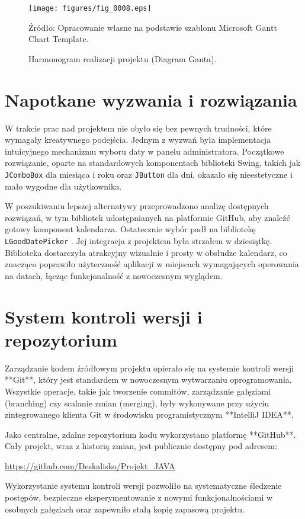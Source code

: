 \begin{figure}[H]
    \centering
    \texttt{[image: figures/fig\_0008.eps]}
    \caption{Harmonogram realizacji projektu (Diagram Ganta).}
    \label{fig:gantt_chart}
    \small{Źródło: Opracowanie własne na podstawie szablonu Microsoft Gantt Chart Template.}
\end{figure}
\clearpage

\section{Napotkane wyzwania i rozwiązania}
W trakcie prac nad projektem nie obyło się bez pewnych trudności, które wymagały kreatywnego podejścia. Jednym z wyzwań była implementacja intuicyjnego mechanizmu wyboru daty w panelu administratora. Początkowe rozwiązanie, oparte na standardowych komponentach biblioteki Swing, takich jak \texttt{JComboBox} dla miesiąca i roku oraz \texttt{JButton} dla dni, okazało się nieestetyczne i mało wygodne dla użytkownika.

W poszukiwaniu lepszej alternatywy przeprowadzono analizę dostępnych rozwiązań, w tym bibliotek udostępnianych na platformie GitHub, aby znaleźć gotowy komponent kalendarza. Ostatecznie wybór padł na bibliotekę \texttt{LGoodDatePicker} \cite{LGoodDatePicker}. Jej integracja z projektem była strzałem w dziesiątkę. Biblioteka dostarczyła atrakcyjny wizualnie i prosty w obsłudze kalendarz, co znacząco poprawiło użyteczność aplikacji w miejscach wymagających operowania na datach, łącząc funkcjonalność z nowoczesnym wyglądem.

\section{System kontroli wersji i repozytorium}
Zarządzanie kodem źródłowym projektu opierało się na systemie kontroli wersji **Git**, który jest standardem w nowoczesnym wytwarzaniu oprogramowania. Wszystkie operacje, takie jak tworzenie commitów, zarządzanie gałęziami (branching) czy scalanie zmian (merging), były wykonywane przy użyciu zintegrowanego klienta Git w środowisku programistycznym **IntelliJ IDEA**.

Jako centralne, zdalne repozytorium kodu wykorzystano platformę **GitHub**. Cały projekt, wraz z historią zmian, jest publicznie dostępny pod adresem:
\begin{center}
    \url{https://github.com/Deskalisko/Projekt_JAVA}
\end{center}
Wykorzystanie systemu kontroli wersji pozwoliło na systematyczne śledzenie postępów, bezpieczne eksperymentowanie z nowymi funkcjonalnościami w osobnych gałęziach oraz zapewniło stałą kopię zapasową projektu.

\clearpage
